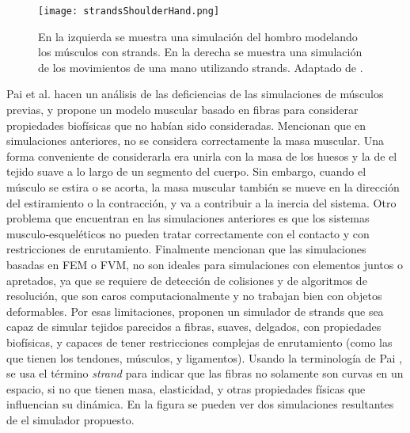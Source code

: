 \begin{figure}
	\centering
		\texttt{[image: strandsShoulderHand.png]}
	\caption[Simulación de hombro y mano utilizano strands.]{En la izquierda se muestra una simulación del hombro modelando los músculos con strands. En la derecha se muestra una simulación de los movimientos de una mano utilizando strands. Adaptado de \citep{pai2011dynamics}.}
		\label{fig:strandsShoulderHand}
\end{figure}

Pai et al. \citep{pai2011dynamics} hacen un análisis de las deficiencias de las simulaciones de músculos previas, y propone un modelo muscular basado en fibras para considerar propiedades biofísicas que no habían sido consideradas. Mencionan que en simulaciones anteriores, no se considera correctamente la masa muscular. Una forma conveniente de considerarla era unirla con la masa de los huesos y la de el tejido suave a lo largo de un segmento del cuerpo. Sin embargo, cuando el  músculo se estira o se acorta, la masa muscular también se mueve en la dirección del estiramiento o la contracción, y va a contribuir a la inercia del sistema. Otro problema que encuentran en las simulaciones anteriores es que los sistemas musculo-esqueléticos no pueden tratar correctamente con el contacto y con restricciones de enrutamiento. Finalmente mencionan que las simulaciones basadas en FEM o FVM, no son ideales para simulaciones con elementos juntos o apretados, ya que se requiere de detección de colisiones y de algoritmos de resolución, que son caros computacionalmente y no trabajan bien con objetos deformables. Por esas limitaciones, proponen un simulador de strands que sea capaz de simular tejidos parecidos a fibras, suaves, delgados, con propiedades biofísicas, y capaces de tener restricciones complejas de enrutamiento (como las que tienen los tendones, músculos, y ligamentos). Usando la terminología de Pai \citep{pai2002strands}, se usa el término \textit{strand} para indicar que las fibras no solamente son curvas en un espacio, si no que tienen  masa, elasticidad, y otras propiedades físicas que influencian su dinámica. En la figura  se pueden ver dos simulaciones resultantes de el simulador propuesto.

